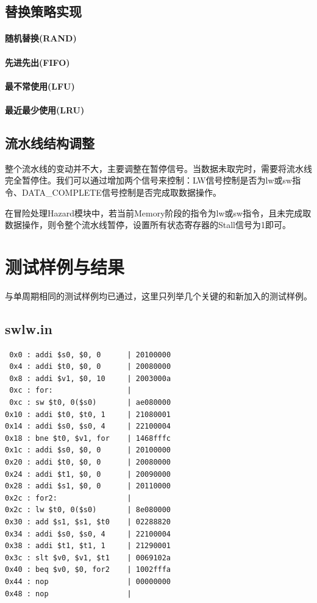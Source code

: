 \documentclass[12pt]{article} %
\begin{document}
\begin{sloppypar}
\subsection{替换策略实现}

\paragraph{随机替换(RAND)}

\paragraph{先进先出(FIFO)}

\paragraph{最不常使用(LFU)}

\paragraph{最近最少使用(LRU)}

\subsection{流水线结构调整}
\label{sec:pipe}

整个流水线的变动并不大，主要调整在暂停信号。当数据未取完时，需要将流水线完全暂停住。我们可以通过增加两个信号来控制：LW信号控制是否为lw或sw指令、DATA\_COMPLETE信号控制是否完成取数据操作。

在冒险处理Hazard模块中，若当前Memory阶段的指令为lw或sw指令，且未完成取数据操作，则令整个流水线暂停，设置所有状态寄存器的Stall信号为1即可。


\newpage
\section{测试样例与结果}

与单周期相同的测试样例均已通过，这里只列举几个关键的和新加入的测试样例。

\subsection{swlw.in}

\begin{lstlisting}
 0x0 : addi $s0, $0, 0      | 20100000
 0x4 : addi $t0, $0, 0      | 20080000
 0x8 : addi $v1, $0, 10     | 2003000a
 0xc : for:                 | 
 0xc : sw $t0, 0($s0)       | ae080000
0x10 : addi $t0, $t0, 1     | 21080001
0x14 : addi $s0, $s0, 4     | 22100004
0x18 : bne $t0, $v1, for    | 1468fffc
0x1c : addi $s0, $0, 0      | 20100000
0x20 : addi $t0, $0, 0      | 20080000
0x24 : addi $t1, $0, 0      | 20090000
0x28 : addi $s1, $0, 0      | 20110000
0x2c : for2:                | 
0x2c : lw $t0, 0($s0)       | 8e080000
0x30 : add $s1, $s1, $t0    | 02288820
0x34 : addi $s0, $s0, 4     | 22100004
0x38 : addi $t1, $t1, 1     | 21290001
0x3c : slt $v0, $v1, $t1    | 0069102a
0x40 : beq $v0, $0, for2    | 1002fffa
0x44 : nop                  | 00000000
0x48 : nop                  | 
\end{lstlisting} 



\end{sloppypar}
\end{document}
